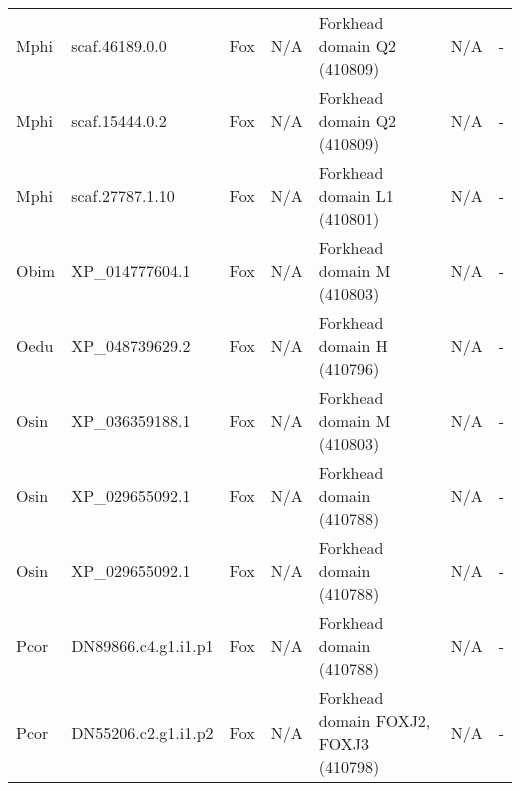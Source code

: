 \documentclass[../main.tex]{subfiles}
\begin{document}
\begin{landscape}
\begin{longtable}{lllllll}
		Mphi           & scaf.46189.0.0        & Fox            & N/A                 & Forkhead domain Q2 (410809)                 & N/A                                                                    & -                    \\
		Mphi           & scaf.15444.0.2        & Fox            & N/A                 & Forkhead domain Q2 (410809)                 & N/A                                                                    & -                    \\
		Mphi           & scaf.27787.1.10       & Fox            & N/A                 & Forkhead domain L1 (410801)                 & N/A                                                                    & -                    \\
		Obim           & XP\_014777604.1       & Fox            & N/A                 & Forkhead domain M (410803)                  & N/A                                                                    & -                    \\
		Oedu           & XP\_048739629.2       & Fox            & N/A                 & Forkhead domain H (410796)                  & N/A                                                                    & -                    \\
		Osin           & XP\_036359188.1       & Fox            & N/A                 & Forkhead domain M (410803)                  & N/A                                                                    & -                    \\
		Osin           & XP\_029655092.1       & Fox            & N/A                 & Forkhead domain (410788)                    & N/A                                                                    & -                    \\
		Osin           & XP\_029655092.1       & Fox            & N/A                 & Forkhead domain (410788)                    & N/A                                                                    & -                    \\
		Pcor           & DN89866.c4.g1.i1.p1   & Fox            & N/A                 & Forkhead domain (410788)                    & N/A                                                                    & -                    \\
		Pcor           & DN55206.c2.g1.i1.p2   & Fox            & N/A                 & Forkhead domain FOXJ2, FOXJ3 (410798)       & N/A                                                                    & -                    \\

\end{longtable}
\end{landscape}
\end{document}
